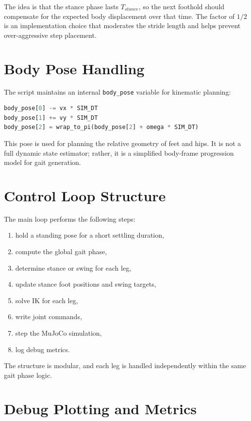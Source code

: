 \documentclass[11pt,a4paper]{report}
\begin{document}
The idea is that the stance phase lasts \(T_{stance}\), so the next foothold should compensate for the expected body displacement over that time. The factor of \(1/2\) is an implementation choice that moderates the stride length and helps prevent over-aggressive step placement.

\section{Body Pose Handling}

The script maintains an internal \texttt{body\_pose} variable for kinematic planning:
\begin{lstlisting}[language=Python]
body_pose[0] -= vx * SIM_DT
body_pose[1] += vy * SIM_DT
body_pose[2] = wrap_to_pi(body_pose[2] + omega * SIM_DT)
\end{lstlisting}

This pose is used for planning the relative geometry of feet and hips. It is not a full dynamic state estimator; rather, it is a simplified body-frame progression model for gait generation.

\section{Control Loop Structure}

The main loop performs the following steps:
\begin{enumerate}
    \item hold a standing pose for a short settling duration,
    \item compute the global gait phase,
    \item determine stance or swing for each leg,
    \item update stance foot positions and swing targets,
    \item solve IK for each leg,
    \item write joint commands,
    \item step the MuJoCo simulation,
    \item log debug metrics.
\end{enumerate}

The structure is modular, and each leg is handled independently within the same gait phase logic.

\section{Debug Plotting and Metrics}
\end{document}
